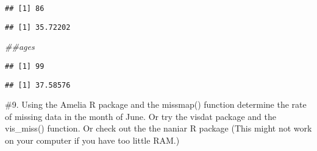 \documentclass[]{article}
\newenvironment{Shaded}{\begin{snugshade}}{\end{snugshade}}
\newcommand{\CommentTok}[1]{\textcolor[rgb]{0.56,0.35,0.01}{\textit{#1}}}
\newcommand{\DataTypeTok}[1]{\textcolor[rgb]{0.13,0.29,0.53}{#1}}
\newcommand{\DecValTok}[1]{\textcolor[rgb]{0.00,0.00,0.81}{#1}}
\newcommand{\KeywordTok}[1]{\textcolor[rgb]{0.13,0.29,0.53}{\textbf{#1}}}
\newcommand{\NormalTok}[1]{#1}
\newcommand{\OperatorTok}[1]{\textcolor[rgb]{0.81,0.36,0.00}{\textbf{#1}}}
\newcommand{\OtherTok}[1]{\textcolor[rgb]{0.56,0.35,0.01}{#1}}
\newcommand{\StringTok}[1]{\textcolor[rgb]{0.31,0.60,0.02}{#1}}
\begin{document}
\begin{verbatim}
## [1] 86
\end{verbatim}

\begin{Shaded}
\end{Shaded}

\begin{verbatim}
## [1] 35.72202
\end{verbatim}

\begin{Shaded}
\begin{Highlighting}[]
\CommentTok{##ages}
\end{Highlighting}
\end{Shaded}

\begin{Shaded}
\end{Shaded}

\begin{verbatim}
## [1] 99
\end{verbatim}

\begin{Shaded}
\end{Shaded}

\begin{verbatim}
## [1] 37.58576
\end{verbatim}

\newpage

\#9. Using the Amelia R package and the missmap() function determine the
rate of missing data in the month of June. Or try the visdat package and
the vis\_miss() function. Or check out the the naniar R package (This
might not work on your computer if you have too little RAM.)
\end{document}
